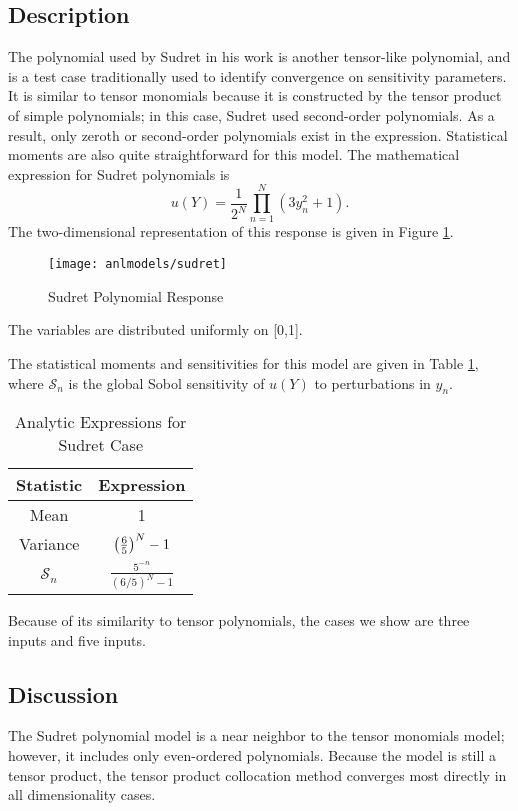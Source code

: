 \subsection{Description}\label{mod:sudret}
The polynomial used by Sudret in his work \cite{sudret} is another tensor-like polynomial, and is a test case traditionally used to
identify convergence on sensitivity parameters.  It is similar to tensor monomials because it is constructed by the tensor
product of simple polynomials; in this case, Sudret used second-order polynomials.  As a result, only zeroth or second-order
polynomials exist in the expression.  Statistical moments are also quite straightforward for this model.
The mathematical expression for Sudret polynomials is
\begin{equation}
  u(Y) = \frac{1}{2^N}\prod_{n=1}^N (3y_n^2+1).
\end{equation}
The two-dimensional representation of this response is given in Figure \ref{fig: sudret}.
\begin{figure}[htb]
  \centering
  \texttt{[image: anlmodels/sudret]}
  \caption{Sudret Polynomial Response}
  \label{fig: sudret}
\end{figure}
The variables are distributed uniformly on [0,1].

The statistical moments and sensitivities for this model are given in
Table \ref{tab:sudret}, where $\mathcal{S}_n$ is the global Sobol sensitivity of $u(Y)$ to perturbations in
$y_n$.

\begin{table}[H]
  \centering
  \begin{tabular}{c c}
    Statistic & Expression \\\hline
    Mean & 1 \\
    Variance & $\qty(\frac{6}{5})^N - 1$ \\
    $\mathcal{S}_n$ & $\frac{5^{-n}}{(6/5)^N-1}$
  \end{tabular}
  \caption{Analytic Expressions for Sudret Case}
  \label{tab:sudret}
\end{table}
Because of its similarity to tensor polynomials, the cases we show are three inputs and five inputs.

\subsection{Discussion}
The Sudret polynomial model is a near neighbor to the
tensor monomials model; however, it includes only even-ordered polynomials.
Because the model is still a tensor product, the tensor product collocation method 
converges most directly in all dimensionality cases.

